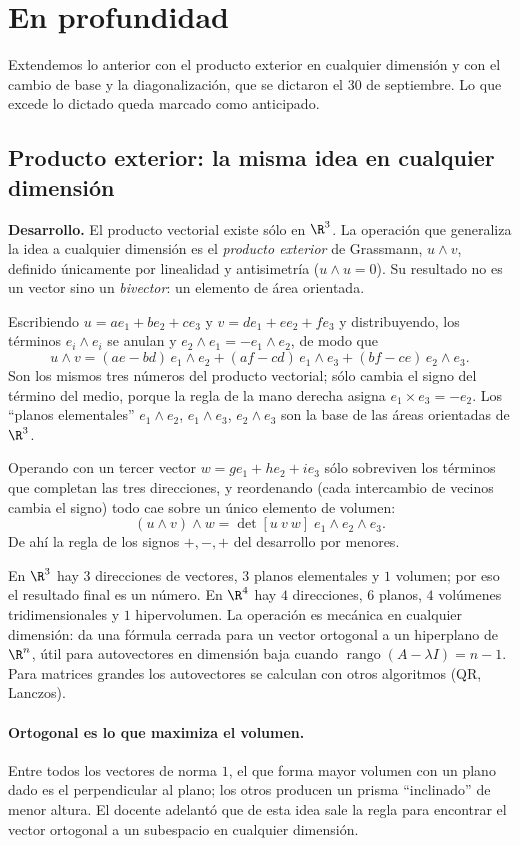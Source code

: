 \section{En profundidad}


Extendemos lo anterior con el producto exterior en cualquier dimensión y con el cambio de base y la diagonalización, que se dictaron el 30 de septiembre. Lo que excede lo dictado queda marcado como anticipado.

\subsection{Producto exterior: la misma idea en cualquier dimensión}\label{sec:exterior}

\textbf{Desarrollo.} El producto vectorial existe sólo en \(\R^3\). La operación que
generaliza la idea a cualquier dimensión es el \emph{producto exterior} de Grassmann,
\(u\wedge v\), definido únicamente por linealidad y antisimetría (\(u\wedge u=0\)). Su
resultado no es un vector sino un \emph{bivector}: un elemento de área orientada.

Escribiendo \(u=ae_1+be_2+ce_3\) y \(v=de_1+ee_2+fe_3\) y distribuyendo, los términos
\(e_i\wedge e_i\) se anulan y \(e_2\wedge e_1=-e_1\wedge e_2\), de modo que
\[
  u\wedge v=(ae-bd)\,e_1\wedge e_2+(af-cd)\,e_1\wedge e_3+(bf-ce)\,e_2\wedge e_3 .
\]
Son los mismos tres números del producto vectorial; sólo cambia el signo del término del
medio, porque la regla de la mano derecha asigna \(e_1\times e_3=-e_2\). Los ``planos
elementales'' \(e_1\wedge e_2\), \(e_1\wedge e_3\), \(e_2\wedge e_3\) son la base de las
áreas orientadas de \(\R^3\).

Operando con un tercer vector \(w=ge_1+he_2+ie_3\) sólo sobreviven los términos que completan
las tres direcciones, y reordenando (cada intercambio de vecinos cambia el signo) todo cae
sobre un único elemento de volumen:
\[
  (u\wedge v)\wedge w=\det[u\ v\ w]\;e_1\wedge e_2\wedge e_3 .
\]
De ahí la regla de los signos \(+,-,+\) del desarrollo por menores.

\begin{idea}
En \(\R^3\) hay \(3\) direcciones de vectores, \(3\) planos elementales y \(1\) volumen; por
eso el resultado final es un número. En \(\R^4\) hay \(4\) direcciones, \(6\) planos, \(4\)
volúmenes tridimensionales y \(1\) hipervolumen. La operación es mecánica en cualquier
dimensión: da una fórmula cerrada para un vector ortogonal a un hiperplano de \(\R^n\), útil
para autovectores en dimensión baja cuando \(\operatorname{rango}(A-\lambda I)=n-1\). Para
matrices grandes los autovectores se calculan con otros algoritmos (QR, Lanczos).
\end{idea}

\paragraph{Ortogonal es lo que maximiza el volumen.} Entre todos los vectores de norma
\(1\), el que forma mayor volumen con un plano dado es el perpendicular al plano; los otros
producen un prisma ``inclinado'' de menor altura. El docente adelantó que de esta idea sale
la regla para encontrar el vector ortogonal a un subespacio en cualquier dimensión.
